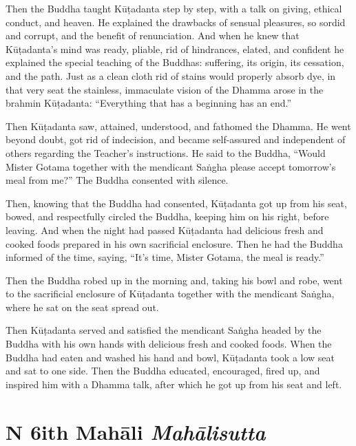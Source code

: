 \documentclass[12pt,openany]{book}%
\newcommand*{\suttatitleacronym}[1]{\smaller[2]{#1}\vspace*{.3em}}
\newcommand*{\suttatitletranslation}[1]{\linebreak{#1}}
\newcommand*{\suttatitleroot}[1]{\linebreak\smaller[2]\itshape{#1}}
\newcommand*{\tocacronym}[1]{\hspace*{-3.3em}{#1}\quad}
\newcommand*{\toctranslation}[1]{#1}
\newcommand*{\tocroot}[1]{(\textit{#1})}
\renewcommand*{\tocacronym}[1]{\hspace*{0em}{#1}\quad}%
\begin{document}
Then the Buddha taught \textsanskrit{Kūṭadanta} step by step, with a talk on giving, ethical conduct, and heaven. He explained the drawbacks of sensual pleasures, so sordid and corrupt, and the benefit of renunciation. And when he knew that \textsanskrit{Kūṭadanta}’s mind was ready, pliable, rid of hindrances, elated, and confident he explained the special teaching of the Buddhas: suffering, its origin, its cessation, and the path. Just as a clean cloth rid of stains would properly absorb dye, in that very seat the stainless, immaculate vision of the Dhamma arose in the brahmin \textsanskrit{Kūṭadanta}: “Everything that has a beginning has an end.” 

Then \textsanskrit{Kūṭadanta} saw, attained, understood, and fathomed the Dhamma. He went beyond doubt, got rid of indecision, and became self-assured and independent of others regarding the Teacher’s instructions. He said to the Buddha, “Would Mister Gotama together with the mendicant \textsanskrit{Saṅgha} please accept tomorrow’s meal from me?” The Buddha consented with silence. 

Then, knowing that the Buddha had consented, \textsanskrit{Kūṭadanta} got up from his seat, bowed, and respectfully circled the Buddha, keeping him on his right, before leaving. And when the night had passed \textsanskrit{Kūṭadanta} had delicious fresh and cooked foods prepared in his own sacrificial enclosure. Then he had the Buddha informed of the time, saying, “It’s time, Mister Gotama, the meal is ready.” 

Then the Buddha robed up in the morning and, taking his bowl and robe, went to the sacrificial enclosure of \textsanskrit{Kūṭadanta} together with the mendicant \textsanskrit{Saṅgha}, where he sat on the seat spread out. 

Then \textsanskrit{Kūṭadanta} served and satisfied the mendicant \textsanskrit{Saṅgha} headed by the Buddha with his own hands with delicious fresh and cooked foods. When the Buddha had eaten and washed his hand and bowl, \textsanskrit{Kūṭadanta} took a low seat and sat to one side. Then the Buddha educated, encouraged, fired up, and inspired him with a Dhamma talk, after which he got up from his seat and left. 

%
\chapter*{{\suttatitleacronym DN 6}{\suttatitletranslation With Mahāli }{\suttatitleroot Mahālisutta}}
\addcontentsline{toc}{chapter}{\tocacronym{DN 6} \toctranslation{With Mahāli } \tocroot{Mahālisutta}}
\end{document}
